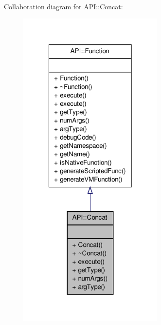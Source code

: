 Collaboration diagram for A\-P\-I\-:\-:Concat\-:
\nopagebreak
\begin{figure}[H]
\begin{center}
\leavevmode
\includegraphics[width=206pt]{class_a_p_i_1_1_concat__coll__graph}
\end{center}
\end{figure}
